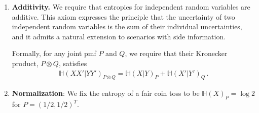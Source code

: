 \documentclass[aps,pra,11pt,onecolumn,nofootinbib,tightenlines]{revtex4-2}
\theoremstyle{definition}
\renewcommand{\H}{\mathbb{H}}
\begin{document}
\begin{enumerate}
    \smallskip

   When representing a joint probability mass function as a matrix, mixing channels acting on the system $X$ can be described by left multiplication with a doubly stochastic matrix $S$. In addition, channels acting on the side information correspond to right multiplication by a row-stochastic matrix $D$. Finally, conditional operations can be represented by a family of row sub-stochastic matrices $D_i$ acting on the right, whose sum $\sum_i D_i$ is row-stochastic, together with a corresponding family of doubly stochastic matrices $S_i$ acting on the left (see~\cite{gour2018conditional} for more details).
    Explicitly, conditionally mixing channels from $m \times n$ matrices $P$ to $m \times n'$ matrices $Q$ act as
    \begin{align}
        P \mapsto Q = \sum_{i=1}^k S_i P D_i \,, \label{eq:intro/mixing}
    \end{align}
    where $S_i$ are doubly stochastic $m \times m$ matrices for all $i$ and $D_i$ are sub-stochastic $n \times n'$ matrices such that their sum $\sum_{i=1}^k D_i$ is row-stochastic.   We require that for any conditionally mixing channel, any $P$, and $Q$ as defined in~\eqref{eq:intro/mixing}, it holds that
    \begin{align}
        \H(X|Y)_P \leq \H(X|Y')_Q \,.
    \end{align}
\label{it: conditionally mixing channels}
    \item \textbf{Additivity.} We require that entropies for independent random variables are additive. This axiom expresses the principle that the uncertainty of two independent random variables is the sum of their individual uncertainties, and it admits a natural extension to scenarios with side information.

    \smallskip

    Formally, for any joint pmf $P$ and $Q$, we require that their Kronecker product, $P \otimes Q$, satisfies
    \begin{align}
        \H(XX'|YY')_{P\otimes Q} = \H(X|Y)_P + \H(X'|Y')_Q \,.
    \end{align}

    \item \textbf{Normalization}: We fix the entropy of a fair coin toss to be $\H(X)_P = \log 2$ for $P = (1/2,1/2)^T$.

\end{enumerate}

\end{document}
